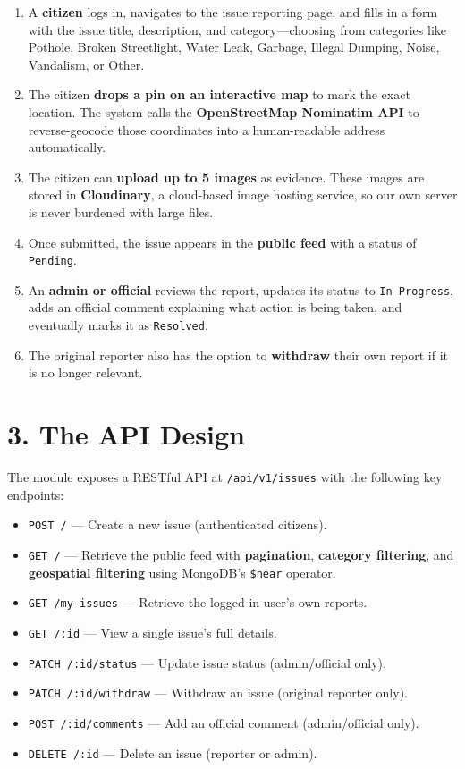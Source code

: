 \documentclass[12pt,a4paper]{article}
\begin{document}
\begin{enumerate}[nosep]
    \item A \textbf{citizen} logs in, navigates to the issue reporting page, and fills in a form with the issue title, description, and category---choosing from categories like Pothole, Broken Streetlight, Water Leak, Garbage, Illegal Dumping, Noise, Vandalism, or Other.
    \item The citizen \textbf{drops a pin on an interactive map} to mark the exact location. The system calls the \textbf{OpenStreetMap Nominatim API} to reverse-geocode those coordinates into a human-readable address automatically.
    \item The citizen can \textbf{upload up to 5 images} as evidence. These images are stored in \textbf{Cloudinary}, a cloud-based image hosting service, so our own server is never burdened with large files.
    \item Once submitted, the issue appears in the \textbf{public feed} with a status of \texttt{Pending}.
    \item An \textbf{admin or official} reviews the report, updates its status to \texttt{In~Progress}, adds an official comment explaining what action is being taken, and eventually marks it as \texttt{Resolved}.
    \item The original reporter also has the option to \textbf{withdraw} their own report if it is no longer relevant.
\end{enumerate}

\section{3. The API Design}

The module exposes a RESTful API at \texttt{/api/v1/issues} with the following key endpoints:

\begin{itemize}[nosep]
    \item \texttt{POST /} --- Create a new issue (authenticated citizens).
    \item \texttt{GET /} --- Retrieve the public feed with \textbf{pagination}, \textbf{category filtering}, and \textbf{geospatial filtering} using MongoDB's \texttt{\$near} operator.
    \item \texttt{GET /my-issues} --- Retrieve the logged-in user's own reports.
    \item \texttt{GET /:id} --- View a single issue's full details.
    \item \texttt{PATCH /:id/status} --- Update issue status (admin/official only).
    \item \texttt{PATCH /:id/withdraw} --- Withdraw an issue (original reporter only).
    \item \texttt{POST /:id/comments} --- Add an official comment (admin/official only).
    \item \texttt{DELETE /:id} --- Delete an issue (reporter or admin).
\end{itemize}
\end{document}
